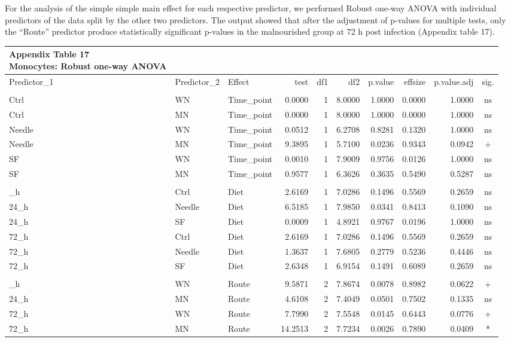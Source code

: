 \documentclass[
  12pt,
  letterpaper,
]{article}
\begin{document}
For the analysis of the simple simple main effect for each respective predictor, we performed Robust one-way ANOVA with individual predictors of the data split by the other two predictors. The output showed that after the adjustment of p-values for multiple tests, only the ``Route'' predictor produce statistically significant p-values in the malnourished group at 72 h post infection (Appendix table 17).

\begingroup
\fontsize{12.0pt}{14.4pt}\selectfont
\begin{longtable}{lllrrrrrrc}
\caption*{
{\large \textbf{Appendix Table 17}} \\ 
{\small \textbf{Monocytes: Robust one-way ANOVA}}
} \\ 
\toprule
Predictor\_1 & Predictor\_2 & {Effect} & {test} & {df1} & {df2} & {p.value} & {effsize} & {p.value.adj} & {sig.} \\ 
\midrule\addlinespace[2.5pt]
\multicolumn{10}{l}{Predictor: Time\_point} \\[2.5pt] 
\midrule\addlinespace[2.5pt]
Ctrl & WN & Time\_point & 0.0000 & 1 & 8.0000 & 1.0000 & 0.0000 & 1.0000 & ns \\ 
Ctrl & MN & Time\_point & 0.0000 & 1 & 8.0000 & 1.0000 & 0.0000 & 1.0000 & ns \\ 
Needle & WN & Time\_point & 0.0512 & 1 & 6.2708 & 0.8281 & 0.1320 & 1.0000 & ns \\ 
Needle & MN & Time\_point & 9.3895 & 1 & 5.7100 & 0.0236 & 0.9343 & 0.0942 & + \\ 
SF & WN & Time\_point & 0.0010 & 1 & 7.9009 & 0.9756 & 0.0126 & 1.0000 & ns \\ 
SF & MN & Time\_point & 0.9577 & 1 & 6.3626 & 0.3635 & 0.5490 & 0.5287 & ns \\ 
\midrule\addlinespace[2.5pt]
\multicolumn{10}{l}{Predictor: Diet} \\[2.5pt] 
\midrule\addlinespace[2.5pt]
24\_h & Ctrl & Diet & 2.6169 & 1 & 7.0286 & 0.1496 & 0.5569 & 0.2659 & ns \\ 
24\_h & Needle & Diet & 6.5185 & 1 & 7.9850 & 0.0341 & 0.8413 & 0.1090 & ns \\ 
24\_h & SF & Diet & 0.0009 & 1 & 4.8921 & 0.9767 & 0.0196 & 1.0000 & ns \\ 
72\_h & Ctrl & Diet & 2.6169 & 1 & 7.0286 & 0.1496 & 0.5569 & 0.2659 & ns \\ 
72\_h & Needle & Diet & 1.3637 & 1 & 7.6805 & 0.2779 & 0.5236 & 0.4446 & ns \\ 
72\_h & SF & Diet & 2.6348 & 1 & 6.9154 & 0.1491 & 0.6089 & 0.2659 & ns \\ 
\midrule\addlinespace[2.5pt]
\multicolumn{10}{l}{Predictor: Route} \\[2.5pt] 
\midrule\addlinespace[2.5pt]
24\_h & WN & Route & 9.5871 & 2 & 7.8674 & 0.0078 & 0.8982 & 0.0622 & + \\ 
24\_h & MN & Route & 4.6108 & 2 & 7.4049 & 0.0501 & 0.7502 & 0.1335 & ns \\ 
72\_h & WN & Route & 7.7990 & 2 & 7.5548 & 0.0145 & 0.6443 & 0.0776 & + \\ 
72\_h & MN & Route & 14.2513 & 2 & 7.7234 & 0.0026 & 0.7890 & 0.0409 & * \\ 
\bottomrule
\end{longtable}
\endgroup
\end{document}
